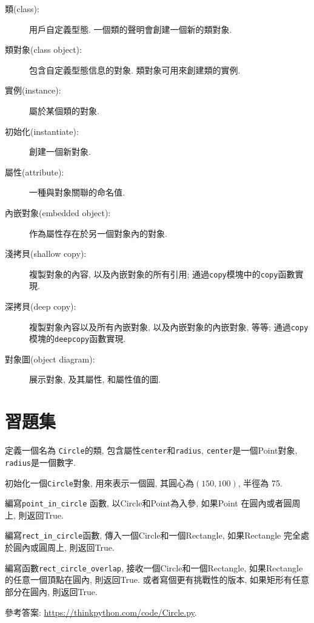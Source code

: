 \documentclass[10pt]{book}
\begin{document}
\begin{description}

\item[類(class):] 用戶自定義型態. 一個類的聲明會創建一個新的類對象. 

\item[類對象(class object):] 包含自定義型態信息的對象. 
類對象可用來創建類的實例. 

\item[實例(instance):] 屬於某個類的對象. 

\item[初始化(instantiate):] 創建一個新對象.

\item[屬性(attribute):] 一種與對象關聯的命名值. 

\item[內嵌對象(embedded object):] 作為屬性存在於另一個對象內的對象. 

\item[淺拷貝(shallow copy):] 複製對象的內容, 以及內嵌對象的所有引用;
通過{\tt copy}模塊中的{\tt copy}函數實現. 

\item[深拷貝(deep copy):] 複製對象內容以及所有內嵌對象, 以及內嵌對象的內嵌對象, 等等;
通過{\tt copy} 模塊的{\tt deepcopy}函數實現. 

\item[對象圖(object diagram):] 展示對象, 及其屬性, 和屬性值的圖. 

\end{description}


\section{習題集}

\begin{exercise}

定義一個名為 {\tt Circle}的類, 包含屬性{\tt center}和{\tt radius}, 
 {\tt center}是一個Point對象, {\tt radius}是一個數字. 

初始化一個{\tt Circle}對象, 用來表示一個圓, 其圓心為$(150, 100)$, 
半徑為 75.

編寫\verb"point_in_circle" 函數, 以Circle和Point為入參, 
如果Point 在圓內或者圓周上, 則返回True. 

編寫\verb"rect_in_circle"函數, 傳入一個Circle和一個Rectangle, 
如果Rectangle 完全處於圓內或圓周上, 則返回True. 

編寫函數\verb"rect_circle_overlap", 接收一個Circle和一個Rectangle, 
如果Rectangle的任意一個頂點在圓內, 則返回True. 
或者寫個更有挑戰性的版本, 如果矩形有任意部分在圓內, 則返回True. 

參考答案: \url{https://thinkpython.com/code/Circle.py}.

\end{exercise}
\end{document}
